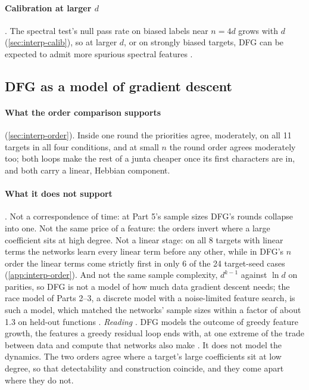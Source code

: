 \paragraph{Calibration at larger $d$} . The spectral test's null pass rate on biased labels near $n=4d$ grows with $d$ (\cref{sec:interp-calib}), so at larger $d$, or on strongly biased targets, DFG can be expected to admit more spurious spectral features .

\subsection{DFG as a model of gradient descent}\label{sec:disc-gd}

\paragraph{What the order comparison supports}  (\cref{sec:interp-order}). Inside one round the priorities agree, moderately, on all 11 targets in all four conditions, and at small $n$ the round order agrees moderately too; both loops make the rest of a junta cheaper once its first characters are in, and both carry a linear, Hebbian component.

\paragraph{What it does not support} . Not a correspondence of time: at Part 5's sample sizes DFG's rounds collapse into one. Not the same price of a feature: the orders invert where a large coefficient sits at high degree. Not a linear stage: on all 8 targets with linear terms the networks learn every linear term before any other, while in DFG's $n$ order the linear terms come strictly first in only 6 of the 24 target-seed cases (\cref{app:interp-order}). And not the same sample complexity, $d^{k-1}$ against $\ln d$ on parities, so DFG is not a model of how much data gradient descent needs; the race model of Parts 2--3, a discrete model with a noise-limited feature search, is such a model, which matched the networks' sample sizes within a factor of about 1.3 on held-out functions \cite{gdcircuit2026}. \emph{Reading} . DFG models the outcome of greedy feature growth, the features a greedy residual loop ends with, at one extreme of the trade between data and compute that networks also make \cite{edelman2023pareto}. It does not model the dynamics. The two orders agree where a target's large coefficients sit at low degree, so that detectability and construction coincide, and they come apart where they do not.

